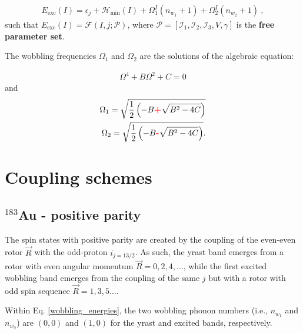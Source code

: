 \documentclass[12pt, a4paper]{article}
\begin{document}
\begin{align}
    E_\text{exc}(I)=\epsilon_j+\mathcal{H}_\text{min}(I)+\Omega_1^I\left(n_{w_1}+1\right)+\Omega_2^I\left(n_{w_2}+1\right)\ ,
    \label{wobbling_energies}
\end{align}
such that $E_\text{exc}(I)=\mathcal{F}(I,j;\mathcal{P})$, where $\mathcal{P}=\left[\mathcal{I}_1,\mathcal{I}_2,\mathcal{I}_3,V,\gamma\right]$ is the \textbf{free parameter set}.

The wobbling frequencies $\Omega_1$ and $\Omega_2$ are the solutions of the algebraic equation:

\begin{align}
    \Omega^4+B\Omega^2+C=0
\end{align}
and 
\begin{align}
    \Omega_1=\sqrt{\frac{1}{2}\left(-B{\color{red}\textbf{+}}\sqrt{B^2-4C}\right)}\\
    \Omega_2=\sqrt{\frac{1}{2}\left(-B{\color{red}\textbf{-}}\sqrt{B^2-4C}\right)}.
\end{align}

\section{Coupling schemes}

\subsection{$^{183}$Au - positive parity}

The spin states with positive parity are created by the coupling of the even-even rotor $\vec{R}$ with the odd-proton $i_{j=13/2}$. As such, the yrast band emerges from a rotor with even angular momentum $\vec{R}=0,2,4,\dots$, while the first excited wobbling band emerges from the coupling of the same $j$ but with a rotor with odd spin sequence $\vec{R}=1,3,5\dots$.

Within Eq. \ref{wobbling_energies}, the two wobbling phonon numbers (i.e., $n_{w_1}$ and $n_{w_2}$) are $(0,0)$ and $(1,0)$ for the yrast and excited bands, respectively.



\newpage


\end{document}
